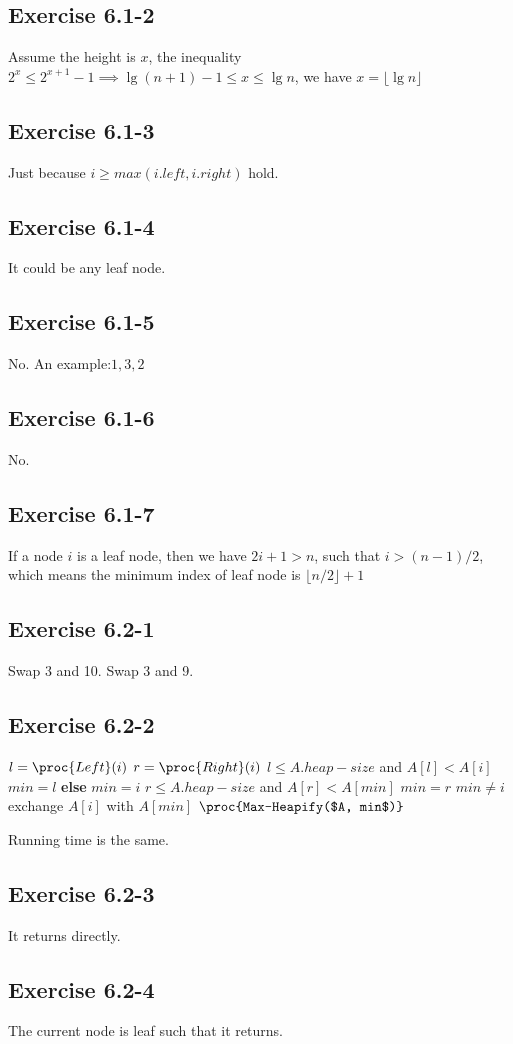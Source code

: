 \documentclass[12pt]{article}
\theoremstyle{definition}
\theoremstyle{remark}
\begin{document}
\subsection*{Exercise 6.1-2}
Assume the height is $x$, the inequality $2^x\le 2^{x+1}-1\implies \lg(n+1)-1\le x\le \lg n$, we have $x=\lfloor \lg n\rfloor$
\subsection*{Exercise 6.1-3}
Just because $i\ge max(i.left,i.right)$ hold.
\subsection*{Exercise 6.1-4}
It could be any leaf node.
\subsection*{Exercise 6.1-5}
No. An example:$1,3,2$
\subsection*{Exercise 6.1-6}
No.
\subsection*{Exercise 6.1-7}
If a node $i$ is a leaf node, then we have $2i+1>n$, such that $i>(n-1)/2$, which means the minimum index of leaf node is $\lfloor n/2\rfloor+1$
\subsection*{Exercise 6.2-1}
Swap 3 and 10. Swap 3 and 9.
\subsection*{Exercise 6.2-2}
\begin{codebox}
\li $l=\proc{Left}(i)$
\li $r=\proc{Right}(i)$
\li \If $l\le A.heap-size$ and $A[l]<A[i]$
\li \quad $min=l$
\li \textbf{else} $min=i$
\li \If $r\le A.heap-size$ and $A[r]<A[min]$
\li \quad $min=r$
\li \If $min\ne i$
\li \quad exchange $A[i]$ with $A[min]$
\li \quad $\proc{Max-Heapify($A, min$)}$
\end{codebox}
Running time is the same.
\subsection*{Exercise 6.2-3}
It returns directly.
\subsection*{Exercise 6.2-4}
The current node is leaf such that it returns.
\end{document}
